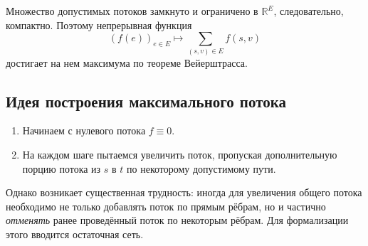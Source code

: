 \begin{Remark}{}{}
	Множество допустимых потоков замкнуто и ограничено в $\mathbb{R}^{E}$, следовательно, компактно. Поэтому непрерывная функция
	\[
	(f(e))_{e\in E}\mapsto \sum_{(s,v)\in E} f(s,v)
	\]
	достигает на нем максимума по теореме Вейерштрасса.
\end{Remark}

\subsection{Идея построения максимального потока}

\begin{enumerate}[label=\arabic*)]
	\item Начинаем с нулевого потока $f\equiv 0$.
	\item На каждом шаге пытаемся увеличить поток, пропуская дополнительную порцию потока из $s$ в $t$ по некоторому допустимому пути.
\end{enumerate}

Однако возникает существенная трудность: иногда для увеличения общего потока необходимо не только добавлять поток по прямым рёбрам, но и частично \emph{отменять} ранее проведённый поток по некоторым рёбрам. Для формализации этого вводится остаточная сеть.

